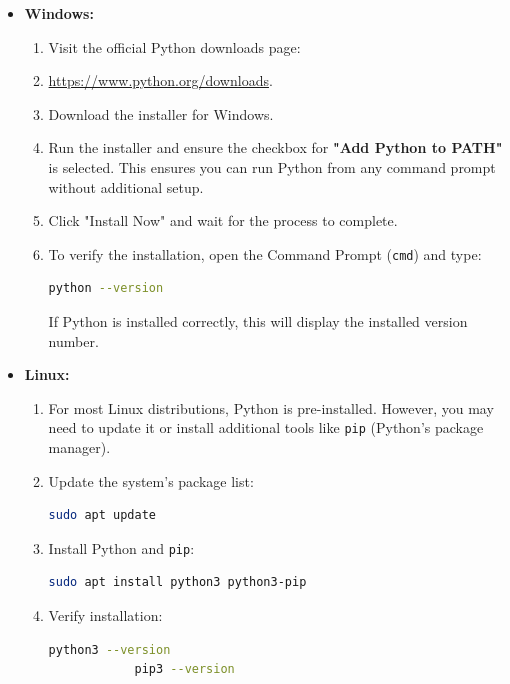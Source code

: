 \begin{itemize}
	\item \textbf{Windows:}
	\begin{enumerate}
		\item Visit the official Python downloads page:
		 \item\href{https://www.python.org/downloads}{https://www.python.org/downloads}.
		\item Download the installer for Windows.
		\item Run the installer and ensure the checkbox for \textbf{"Add Python to PATH"} is selected. This ensures you can run Python from any command prompt without additional setup.
		\item Click "Install Now" and wait for the process to complete.
		\item To verify the installation, open the Command Prompt (\texttt{cmd}) and type:
		\begin{lstlisting}[language=bash]
			python --version
		\end{lstlisting}
		If Python is installed correctly, this will display the installed version number.
	\end{enumerate}
	
	
	\item \textbf{Linux:}
	\begin{enumerate}
		\item For most Linux distributions, Python is pre-installed. However, you may need to update it or install additional tools like \texttt{pip} (Python’s package manager).
		\item Update the system's package list:
		\begin{lstlisting}[language=bash]
			sudo apt update
		\end{lstlisting}
		\item Install Python and \texttt{pip}:
		\begin{lstlisting}[language=bash]
			sudo apt install python3 python3-pip
		\end{lstlisting}
		\item Verify installation:
		\begin{lstlisting}[language=bash]
			python3 --version
			pip3 --version
		\end{lstlisting}
	\end{enumerate}
	

\end{itemize}
